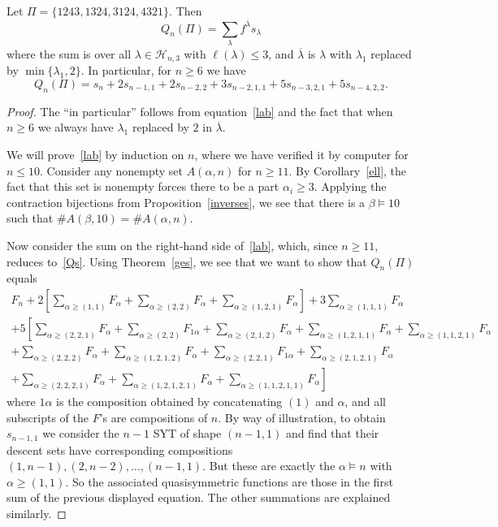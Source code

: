 \documentclass[ALCO,ThmDefs,Unicode,epreuves]{cedram}
\newcommand{\lab}{\ol{\la}}
\newcommand{\comp}{\models}
\newcommand{\ol}{\overline}
\newcommand{\ree}[1]{\eqref{#1}}
\newcommand{\al}{\alpha}
\newcommand{\be}{\beta}
\newcommand{\la}{\lambda}
\newcommand{\cH}{{\mathcal H}}
\begin{document}
\begin{theo}
Let $\Pi=\{1243, 1324, 3124, 4321\}$. Then
\begin{equation}
\label{lab}
Q_n(\Pi)=\sum_\la f^{\lab} s_\la
\end{equation}
where the sum is over all $\la\in\cH_{n,3}$ with $\ell(\la)\le 3$, and $\lab$ is $\la$ with $\la_1$ replaced by $\min\{\la_1,2\}$. In particular, for $n\ge6$ we have
\begin{equation}
\label{Qs}
Q_n(\Pi)=s_n + 2 s_{n-1,1} + 2 s_{n-2,2} + 3 s_{n-2,1,1} + 5 s_{n-3,2,1} + 5 s_{n-4,2,2}.
\end{equation}
\end{theo}
\begin{proof}
The ``in particular'' follows from equation~\ree{lab} and the fact that when $n\ge6$ we always have $\la_1$ replaced by $2$ in $\lab$.

We will prove~\ree{lab} by induction on $n$, where we have verified it by computer for $n\le 10$. Consider any nonempty set $A(\al,n)$ for $n\ge 11$. By Corollary~\ref{ell}, the fact that this set is nonempty forces there to be a part $\al_i\ge 3$. Applying the contraction bijections from Proposition~\ref{inverses}, we see that there is a $\be\comp 10$ such that $\#A(\be,10)=\#A(\al,n)$.

Now consider the sum on the right-hand side of~\ree{lab}, which, since $n\ge11$, reduces to~\ree{Qs}. Using Theorem~\ref{ges}, we see that we want to show that $Q_n(\Pi)$ equals
\begin{multline*}
F_n + 2 \left[\sum_{\al\ge(1,1)} F_\al + \sum_{\al\ge(2,2)} F_\al + \sum_{\al\ge(1,2,1)} F_\al\right ]
+ 3 \sum_{\al\ge(1,1,1)} F_\al
\\[10pt]
+ 5\left[ \sum_{\al\ge(2,2,1)} F_\al + \sum_{\al\ge(2,2)} F_{1\al} + \sum_{\al\ge(2,1,2)} F_\al
+ \sum_{\al\ge(1,2,1,1)} F_\al + \sum_{\al\ge(1,1,2,1)} F_\al \right.
\\[10pt]
\left. + \sum_{\al\ge(2,2,2)} F_\al + \sum_{\al\ge(1,2,1,2)} F_\al + \sum_{\al\ge(2,2,1)} F_{1\al} + \sum_{\al\ge(2,1,2,1)} F_\al
\right.\\
\left. + \sum_{\al\ge(2,2,2,1)} F_\al+ \sum_{\al\ge(1,2,1,2,1)} F_\al + \sum_{\al\ge(1,1,2,1,1)} F_\al
\right]
\end{multline*}
where $1\al$ is the composition obtained by concatenating $(1)$ and $\al$, and all subscripts of the $F$'s are compositions of $n$. 
By way of illustration, to obtain $s_{n-1,1}$ we consider the $n-1$ SYT of shape $(n-1,1)$ and find that their descent sets have corresponding compositions $(1,n-1),(2,n-2),\dots,(n-1,1)$. But these are exactly the $\al\comp n$ with $\al\ge(1,1)$. So the associated quasisymmetric functions are those in the first sum of the previous displayed equation. The other summations are explained similarly.


\end{proof}
\end{document}
